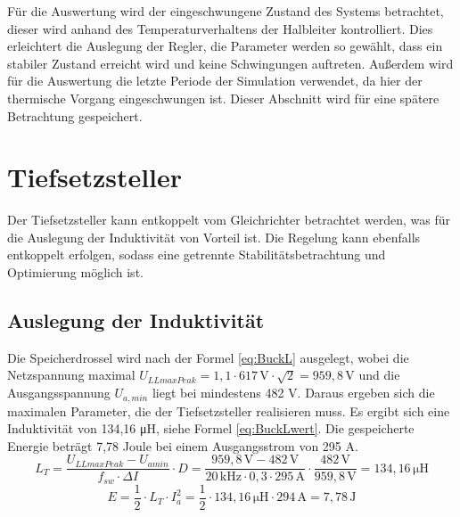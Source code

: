 Für die Auswertung wird der eingeschwungene Zustand des Systems betrachtet, dieser wird anhand des Temperaturverhaltens der Halbleiter kontrolliert. Dies erleichtert die Auslegung der Regler, die Parameter werden so gewählt, dass ein stabiler Zustand erreicht wird und keine Schwingungen auftreten. Außerdem wird für die Auswertung die letzte Periode der Simulation verwendet, da hier der thermische Vorgang eingeschwungen ist. Dieser Abschnitt wird für eine spätere Betrachtung gespeichert.

\section{Tiefsetzsteller}
Der Tiefsetzsteller kann entkoppelt vom Gleichrichter betrachtet werden, was für die Auslegung der Induktivität von Vorteil ist. Die Regelung kann ebenfalls entkoppelt erfolgen, sodass eine getrennte Stabilitätsbetrachtung und Optimierung möglich ist. 
	\subsection{Auslegung der Induktivität}
	Die Speicherdrossel wird nach der Formel \ref{eq:BuckL} ausgelegt, wobei die Netzspannung maximal $U_{LLmaxPeak}=1,1 \cdot 617\, \si{\V} \cdot \sqrt{2}=959,8\, \si{\V}$ und die Ausgangsspannung $U_{a,min}$ liegt bei mindestens 482 \si{\V}. Daraus ergeben sich die maximalen Parameter, die der Tiefsetzsteller realisieren muss. Es ergibt sich eine Induktivität von 134,16 \si{\micro \henry}, siehe Formel \ref{eq:BuckLwert}. Die gespeicherte Energie beträgt 7,78 Joule bei einem Ausgangsstrom von 295 A. 
	\begin{equation}
	\label{eq:BuckLwert}
	L_{T}= \dfrac{U_{LLmaxPeak}-U_{amin}}{f_{sw} \cdot \Delta I} \cdot D = \dfrac{959,8\,\si{\V} - 482\, \si{\V}}{20\, \si{\kilo \hertz}\cdot 0,3 \cdot 295\, \si{\ampere}} \cdot \dfrac{482\, \si{\V}}{959,8\, \si{\V}}= 134,16 \,\si{\micro \henry} 
	\end{equation}
	\begin{equation}
		E=\dfrac{1}{2} \cdot L_{T} \cdot I_{a}^{2} = \dfrac{1}{2} \cdot 134,16\, \si{\micro \henry}  \cdot 294\, \si{\ampere} = 7,78\, \si{\joule}
	\end{equation}

